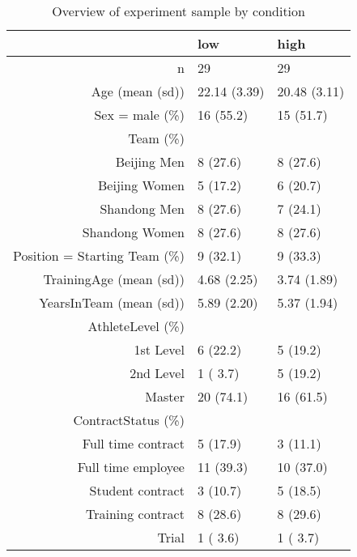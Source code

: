 \begin{table}[ht]
\centering
\begin{tabular}{rll}
  \hline
 & low & high \\ 
  \hline
n &    29 &    29 \\ 
  Age (mean (sd)) & 22.14 (3.39) & 20.48 (3.11) \\ 
  Sex = male (\%) &    16 (55.2)  &    15 (51.7)  \\ 
  Team (\%) &     &     \\ 
     Beijing Men &     8 (27.6)  &     8 (27.6)  \\ 
     Beijing Women &     5 (17.2)  &     6 (20.7)  \\ 
     Shandong Men &     8 (27.6)  &     7 (24.1)  \\ 
     Shandong Women &     8 (27.6)  &     8 (27.6)  \\ 
  Position = Starting Team (\%) &     9 (32.1)  &     9 (33.3)  \\ 
  TrainingAge (mean (sd)) &  4.68 (2.25) &  3.74 (1.89) \\ 
  YearsInTeam (mean (sd)) &  5.89 (2.20) &  5.37 (1.94) \\ 
  AthleteLevel (\%) &     &     \\ 
     1st Level &     6 (22.2)  &     5 (19.2)  \\ 
     2nd Level &     1 ( 3.7)  &     5 (19.2)  \\ 
     Master &    20 (74.1)  &    16 (61.5)  \\ 
  ContractStatus (\%) &     &     \\ 
     Full time contract &     5 (17.9)  &     3 (11.1)  \\ 
     Full time employee &    11 (39.3)  &    10 (37.0)  \\ 
     Student contract &     3 (10.7)  &     5 (18.5)  \\ 
     Training contract &     8 (28.6)  &     8 (29.6)  \\ 
     Trial &     1 ( 3.6)  &     1 ( 3.7)  \\ 
   \hline
\end{tabular}
\caption{Overview of experiment sample by condition} 
\label{tab:athleteDescriptivesConditionTraining}
\end{table}
